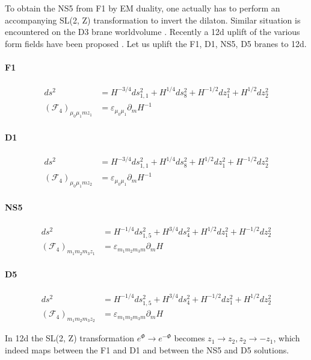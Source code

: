 To obtain the NS5 from F1 by EM duality, one actually has to perform an accompanying SL(2, Z) transformation to invert the dilaton.
Similar situation is encountered on the D3 brane worldvolume \cite{Tseytlin:1996it}.
Recently a 12d uplift of the various form fields have been proposed \cite{Cheng:2025efp}. Let us uplift the F1, D1, NS5, D5 branes to 12d.

\paragraph{F1}
\begin{align}
ds^2
&= H^{-3/4}ds_{1,1}^2 
+ H^{1/4}ds_8^2
+H^{-1/2}dz_1^2
+H^{1/2}dz_2^2\\
(\mathcal{F}_4)_{\mu_0 \mu_1 m z_1} 
&= \varepsilon_{\mu_0 \mu_1}\partial_m H^{-1}
\end{align}

\paragraph{D1}
\begin{align}
ds^2
&= H^{-3/4}ds_{1,1}^2 
+ H^{1/4}ds_8^2
+H^{1/2}dz_1^2
+H^{-1/2}dz_2^2\\
(\mathcal{F}_4)_{\mu_0 \mu_1 m z_2} 
&= \varepsilon_{\mu_0 \mu_1}\partial_m H^{-1}
\end{align}


\paragraph{NS5}
\begin{align}
ds^2
&= H^{-1/4}ds_{1,5}^2 
+ H^{3/4}ds_4^2
+H^{1/2}dz_1^2
+H^{-1/2}dz_2^2\\
(\mathcal{F}_4)_{m_1 m_2 m_3 z_1} 
&= \varepsilon_{m_1 m_2 m_3 m}\partial_m H
\end{align}

\paragraph{D5}
\begin{align}
ds^2
&= H^{-1/4}ds_{1,5}^2 
+ H^{3/4}ds_4^2
+H^{-1/2}dz_1^2
+H^{1/2}dz_2^2\\
(\mathcal{F}_4)_{m_1 m_2 m_3 z_2} 
&= \varepsilon_{m_1 m_2 m_3 m}\partial_m H
\end{align}

In 12d the SL(2, Z) transformation $e^\Phi \to e^{-\Phi}$ becomes $z_1 \to z_2, z_2 \to -z_1$, which indeed maps between the F1 and D1 and between the NS5 and D5 solutions.

